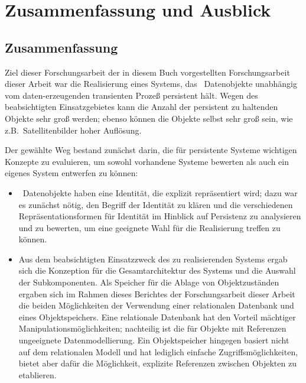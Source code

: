 %
\chapter{Zusammenfassung und Ausblick}%
\label{chap:exit}%
%
\section{Zusammenfassung}
%
Ziel \ifbericht dieser Forschungsarbeit \else\ifbuch der in diesem
Buch vorgestellten Forschungsarbeit \else dieser Arbeit \fi\fi war die
Realisierung eines Systems, das \cl\ Datenobjekte un\-ab\-h\"{a}n\-gig
vom daten-erzeugenden transienten Proze\ss{} persistent h\"{a}lt.
Wegen des beabsichtigten Einsatzgebietes kann die Anzahl der
persistent zu haltenden Objekte sehr gro\ss{} werden; ebenso
k\"{o}n\-nen die Objekte selbst sehr gro\ss{} sein, wie z.B.\ 
Satellitenbilder hoher Aufl\"{o}sung.
%
\par{}Der gew\"{a}hlte Weg bestand zun\"{a}chst darin, die f\"{u}r persistente
Systeme wichtigen Konzepte zu evaluieren, um sowohl vorhandene Systeme
bewerten als auch ein eigenes System entwerfen zu k\"{o}nnen:
\begin{itemize}
%
\item \cl\ Datenobjekte haben eine Identit\"{a}t, die explizit
repr\"{a}sentiert wird; dazu war es zun\"{a}chst n\"{o}tig, den Begriff der
Identit\"{a}t zu kl\"{a}ren und die verschiedenen
Re\-pr\"{a}\-sen\-ta\-tions\-for\-men f\"{u}r Identit\"{a}t im Hinblick auf
Persistenz zu analysieren und zu bewerten, um eine geeignete Wahl f\"{u}r
die Realisierung treffen zu k\"{o}nnen.
%
\item Aus dem beabsichtigten Einsatzzweck des zu realisierenden
  Systems ergab sich die Konzeption f\"{u}r die Gesamtarchitektur des
  Systems und die Auswahl der Subkomponenten. Als Speicher f\"{u}r die
  Ablage von Objektzust\"{a}nden ergaben sich im Rahmen \ifbericht
  dieses Berichtes \else\ifbuch der Forschungsarbeit \else dieser
  Arbeit \fi\fi die beiden M\"{o}glichkeiten der Verwendung einer
  relationalen Datenbank und eines Objektspeichers.  Eine relationale
  Datenbank hat den Vorteil m\"{a}chtiger
  Ma\-ni\-pu\-la\-tions\-m\"{o}g\-lich\-kei\-ten; nachteilig ist die
  f\"{u}r Objekte mit Referenzen ungeeignete Datenmodellierung. Ein
  Objektspeicher hingegen basiert nicht auf dem relationalen Modell
  und hat lediglich einfache Zugriffsm\"{o}glichkeiten, bietet aber
  daf\"{u}r die M\"{o}glichkeit, explizite Referenzen zwischen
  Objekten zu etablieren.
%
\end{itemize}
